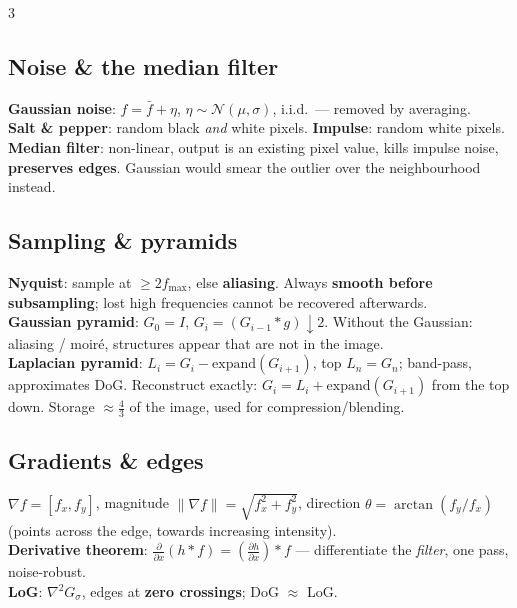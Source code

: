 \documentclass[9pt,a4paper,landscape]{extarticle}
\newcommand{\key}[1]{\textbf{#1}}
\begin{document}
\begin{multicols}{3}
\subsection{Noise \& the median filter}
\key{Gaussian noise}: $f=\bar f+\eta$, $\eta\sim\mathcal N(\mu,\sigma)$, i.i.d.\ --- removed by averaging.\\
\key{Salt \& pepper}: random black \emph{and} white pixels. \key{Impulse}: random white pixels.\\
\key{Median filter}: non-linear, output is an existing pixel value, kills impulse noise, \key{preserves edges}. Gaussian would smear the outlier over the neighbourhood instead.

\subsection{Sampling \& pyramids}
\key{Nyquist}: sample at $\ge 2f_{\max}$, else \key{aliasing}. Always \key{smooth before subsampling}; lost high frequencies cannot be recovered afterwards.\\
\key{Gaussian pyramid}: $G_0=I$, $G_i=(G_{i-1}*g)\!\downarrow\!2$. Without the Gaussian: aliasing / moir\'e, structures appear that are not in the image.\\
\key{Laplacian pyramid}: $L_i=G_i-\mathrm{expand}(G_{i+1})$, top $L_n=G_n$; band-pass, approximates DoG. Reconstruct exactly: $G_i=L_i+\mathrm{expand}(G_{i+1})$ from the top down. Storage $\approx\frac43$ of the image, used for compression/blending.

\subsection{Gradients \& edges}
$\nabla f=[f_x,f_y]$, magnitude $\|\nabla f\|=\sqrt{f_x^2+f_y^2}$, direction $\theta=\arctan(f_y/f_x)$ (points across the edge, towards increasing intensity).\\
\key{Derivative theorem}: $\frac{\partial}{\partial x}(h*f)=(\frac{\partial h}{\partial x})*f$ --- differentiate the \emph{filter}, one pass, noise-robust.\\
\key{LoG}: $\nabla^2 G_\sigma$, edges at \key{zero crossings}; DoG $\approx$ LoG.


\end{multicols}
\end{document}
